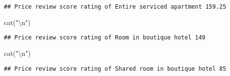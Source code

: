 \documentclass[
]{article}
\newenvironment{Shaded}{\begin{snugshade}}{\end{snugshade}}
\newcommand{\FunctionTok}[1]{\textcolor[rgb]{0.00,0.00,0.00}{#1}}
\newcommand{\NormalTok}[1]{#1}
\newcommand{\OtherTok}[1]{\textcolor[rgb]{0.56,0.35,0.01}{#1}}
\newcommand{\SpecialCharTok}[1]{\textcolor[rgb]{0.00,0.00,0.00}{#1}}
\newcommand{\StringTok}[1]{\textcolor[rgb]{0.31,0.60,0.02}{#1}}
\begin{document}
\begin{verbatim}
## Price review score rating of Entire serviced apartment 159.25
\end{verbatim}

\begin{Shaded}
\begin{Highlighting}[]
\FunctionTok{cat}\NormalTok{(}\StringTok{"}\SpecialCharTok{\textbackslash{}n}\StringTok{"}\NormalTok{)}
\end{Highlighting}
\end{Shaded}

\begin{Shaded}
\end{Shaded}

\begin{verbatim}
## Price review score rating of Room in boutique hotel 149
\end{verbatim}

\begin{Shaded}
\begin{Highlighting}[]
\FunctionTok{cat}\NormalTok{(}\StringTok{"}\SpecialCharTok{\textbackslash{}n}\StringTok{"}\NormalTok{)}
\end{Highlighting}
\end{Shaded}

\begin{Shaded}
\end{Shaded}

\begin{verbatim}
## Price review score rating of Shared room in boutique hotel 85
\end{verbatim}
\end{document}
